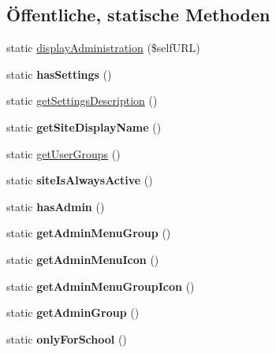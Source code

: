 \subsection*{Öffentliche, statische Methoden}
\begin{DoxyCompactItemize}
\item 
static \mbox{\hyperlink{class_w_lan_tickets_a21a650866f022a0336e38dff872700a8}{display\+Administration}} (\$self\+U\+RL)
\item 
\mbox{\label{class_w_lan_tickets_a35b92929a0da580846e962475313c661}} 
static {\bfseries has\+Settings} ()
\item 
static \mbox{\hyperlink{class_w_lan_tickets_ab0640f1889cb2ef0c646513ea81d3722}{get\+Settings\+Description}} ()
\item 
\mbox{\label{class_w_lan_tickets_a8804eb76e70114863cd22c967d8f8eeb}} 
static {\bfseries get\+Site\+Display\+Name} ()
\item 
static \mbox{\hyperlink{class_w_lan_tickets_a2c9d013eb41498c4e7bf3cc944483aca}{get\+User\+Groups}} ()
\item 
\mbox{\label{class_w_lan_tickets_a463a6d31a1e62bfdc694e59d29482a96}} 
static {\bfseries site\+Is\+Always\+Active} ()
\item 
\mbox{\label{class_w_lan_tickets_a3126510ccb8f3d121cbb3a3112493797}} 
static {\bfseries has\+Admin} ()
\item 
\mbox{\label{class_w_lan_tickets_aa907a94f9a6708e82869cb67ffc2f354}} 
static {\bfseries get\+Admin\+Menu\+Group} ()
\item 
\mbox{\label{class_w_lan_tickets_ac48034832de73ebd6239221eef6ece3a}} 
static {\bfseries get\+Admin\+Menu\+Icon} ()
\item 
\mbox{\label{class_w_lan_tickets_a281738f4d3754d01f48d6188cee1a8be}} 
static {\bfseries get\+Admin\+Menu\+Group\+Icon} ()
\item 
\mbox{\label{class_w_lan_tickets_ac25823393d3079de87c12440076e6c6b}} 
static {\bfseries get\+Admin\+Group} ()
\item 
\mbox{\label{class_w_lan_tickets_a87f8e781c12cfa0b8b83716a6d5e01b1}} 
static {\bfseries only\+For\+School} ()
\end{DoxyCompactItemize}
